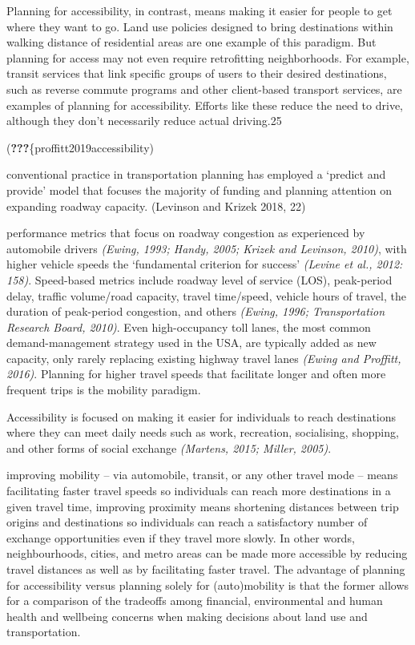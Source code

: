 \documentclass[12pt,]{article}
\begin{document}
Planning for accessibility, in contrast, means making it easier for
people to get where they want to go. Land use policies designed to bring
destinations within walking distance of residential areas are one
example of this paradigm. But planning for access may not even require
retrofitting neighborhoods. For example, transit services that link
specific groups of users to their desired destinations, such as reverse
commute programs and other client-based transport services, are examples
of planning for accessibility. Efforts like these reduce the need to
drive, although they don't necessarily reduce actual driving.25

({\textbf{???}}\{proffitt2019accessibility)

conventional practice in transportation planning has employed a `predict
and provide' model that focuses the majority of funding and planning
attention on expanding roadway capacity. (Levinson and Krizek 2018, 22)

performance metrics that focus on roadway congestion as experienced by
automobile drivers \emph{(Ewing, 1993; Handy, 2005; Krizek and Levinson,
2010)}, with higher vehicle speeds the `fundamental criterion for
success' \emph{(Levine et al., 2012: 158)}. Speed-based metrics include
roadway level of service (LOS), peak-period delay, traffic volume/road
capacity, travel time/speed, vehicle hours of travel, the duration of
peak-period congestion, and others \emph{(Ewing, 1996; Transportation
Research Board, 2010)}. Even high-occupancy toll lanes, the most common
demand-management strategy used in the USA, are typically added as new
capacity, only rarely replacing existing highway travel lanes
\emph{(Ewing and Proffitt, 2016)}. Planning for higher travel speeds
that facilitate longer and often more frequent trips is the mobility
paradigm.

Accessibility is focused on making it easier for individuals to reach
destinations where they can meet daily needs such as work, recreation,
socialising, shopping, and other forms of social exchange
\emph{(Martens, 2015; Miller, 2005)}.

improving mobility -- via automobile, transit, or any other travel mode
-- means facilitating faster travel speeds so individuals can reach more
destinations in a given travel time, improving proximity means
shortening distances between trip origins and destinations so
individuals can reach a satisfactory number of exchange opportunities
even if they travel more slowly. In other words, neighbourhoods, cities,
and metro areas can be made more accessible by reducing travel distances
as well as by facilitating faster travel. The advantage of planning for
accessibility versus planning solely for (auto)mobility is that the
former allows for a comparison of the tradeoffs among financial,
environmental and human health and wellbeing concerns when making
decisions about land use and transportation.
\end{document}
